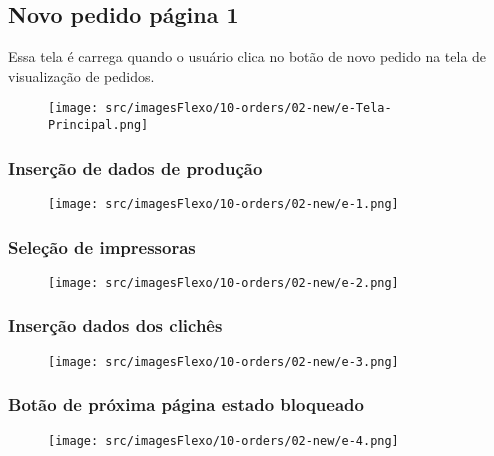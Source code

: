 \thispagestyle{fancy}
\vspace*{\fill}
\subsection{Novo pedido página 1}
 Essa tela é carrega quando o usuário clica no botão de novo pedido na tela de visualização de pedidos.
\begin{figure}[h]
  \centering
  \texttt{[image: src/imagesFlexo/10-orders/02-new/e-Tela-Principal.png]}
\end{figure}

\newpage
\thispagestyle{fancy}
\vspace*{\fill}
\subsubsection{\small{Inserção de dados de produção}}
\begin{figure}[h]
  \centering
  \texttt{[image: src/imagesFlexo/10-orders/02-new/e-1.png]}
\end{figure}
\vspace*{\fill}

\newpage
\thispagestyle{fancy}
\vspace*{\fill}
\subsubsection{\small{Seleção de impressoras}}
\begin{figure}[h]
  \centering
  \texttt{[image: src/imagesFlexo/10-orders/02-new/e-2.png]}
\end{figure}
\vspace*{\fill}

\newpage
\thispagestyle{fancy}
\vspace*{\fill}
\subsubsection{\small{Inserção dados dos clichês}}
\begin{figure}[h]
  \centering
  \texttt{[image: src/imagesFlexo/10-orders/02-new/e-3.png]}
\end{figure}
\vspace*{\fill}

\newpage
\thispagestyle{fancy}
\vspace*{\fill}
\subsubsection{\small{Botão de próxima página estado bloqueado}}
\begin{figure}[h]
  \centering
  \texttt{[image: src/imagesFlexo/10-orders/02-new/e-4.png]}
\end{figure}
\vspace*{\fill}

